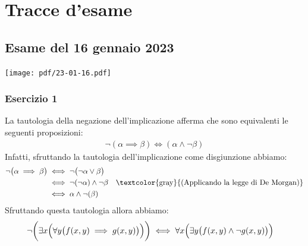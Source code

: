 \chapter{Tracce d'esame}
\section{Esame del 16 gennaio 2023}
\begin{center}
	\texttt{[image: pdf/23-01-16.pdf]}
\end{center}
\subsection*{Esercizio 1}
La tautologia della negazione dell'implicazione afferma che sono equivalenti le seguenti proposizioni:
\begin{align*}
	\neg(\alpha \implies \beta) \iff (\alpha \land \neg \beta)
\end{align*}
Infatti, sfruttando la tautologia dell'implicazione come disgiunzione abbiamo:
\begin{align*}
	\neg \bigl(\alpha \implies \beta \bigr) &\iff \neg \bigl( \neg \alpha \lor \beta \bigr) \\
	&\iff \neg (\neg \alpha) \land \neg \beta & \text{\textcolor{gray}{(Applicando la legge di De Morgan)}} \\
	&\iff \alpha \land \neg(\beta)
\end{align*}
Sfruttando questa tautologia allora abbiamo:
\begin{align*}
	\neg \biggl(\exists x \Bigl(\forall y \bigl( f(x,y) \implies g(x,y) \bigr)\Bigr)\biggr) &\iff \forall x \Bigl( \exists y \bigl( f(x,y) \land \neg g(x,y) \bigr)\Bigr)
\end{align*}
